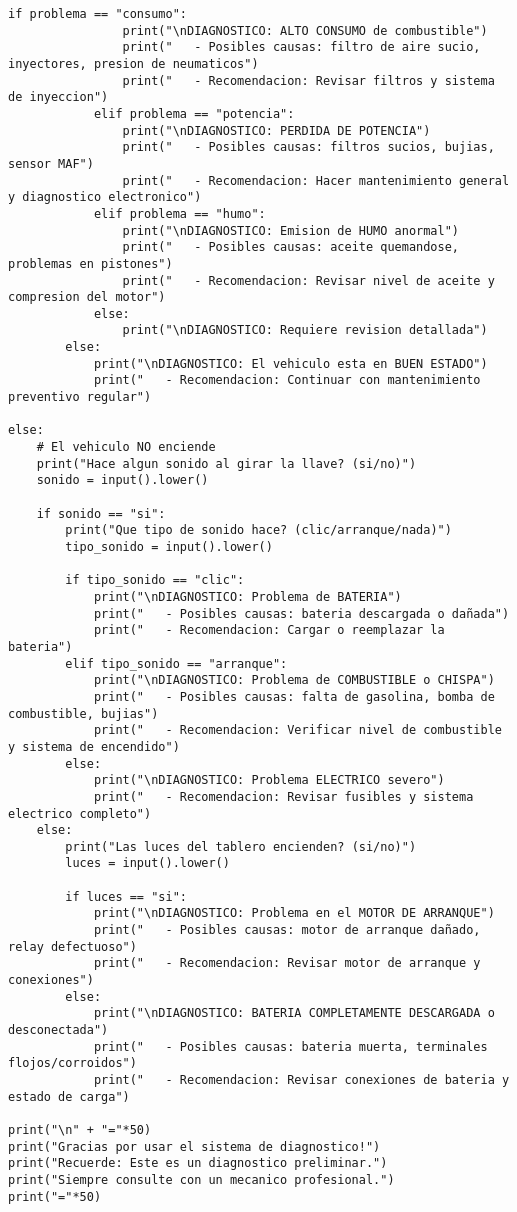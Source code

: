 \documentclass[12pt]{article}
\begin{document}
\begin{lstlisting}[caption={Sistema de Diagnóstico de Vehículos}]
            if problema == "consumo":
                print("\nDIAGNOSTICO: ALTO CONSUMO de combustible")
                print("   - Posibles causas: filtro de aire sucio, inyectores, presion de neumaticos")
                print("   - Recomendacion: Revisar filtros y sistema de inyeccion")
            elif problema == "potencia":
                print("\nDIAGNOSTICO: PERDIDA DE POTENCIA")
                print("   - Posibles causas: filtros sucios, bujias, sensor MAF")
                print("   - Recomendacion: Hacer mantenimiento general y diagnostico electronico")
            elif problema == "humo":
                print("\nDIAGNOSTICO: Emision de HUMO anormal")
                print("   - Posibles causas: aceite quemandose, problemas en pistones")
                print("   - Recomendacion: Revisar nivel de aceite y compresion del motor")
            else:
                print("\nDIAGNOSTICO: Requiere revision detallada")
        else:
            print("\nDIAGNOSTICO: El vehiculo esta en BUEN ESTADO")
            print("   - Recomendacion: Continuar con mantenimiento preventivo regular")

else:
    # El vehiculo NO enciende
    print("Hace algun sonido al girar la llave? (si/no)")
    sonido = input().lower()
    
    if sonido == "si":
        print("Que tipo de sonido hace? (clic/arranque/nada)")
        tipo_sonido = input().lower()
        
        if tipo_sonido == "clic":
            print("\nDIAGNOSTICO: Problema de BATERIA")
            print("   - Posibles causas: bateria descargada o dañada")
            print("   - Recomendacion: Cargar o reemplazar la bateria")
        elif tipo_sonido == "arranque":
            print("\nDIAGNOSTICO: Problema de COMBUSTIBLE o CHISPA")
            print("   - Posibles causas: falta de gasolina, bomba de combustible, bujias")
            print("   - Recomendacion: Verificar nivel de combustible y sistema de encendido")
        else:
            print("\nDIAGNOSTICO: Problema ELECTRICO severo")
            print("   - Recomendacion: Revisar fusibles y sistema electrico completo")
    else:
        print("Las luces del tablero encienden? (si/no)")
        luces = input().lower()
        
        if luces == "si":
            print("\nDIAGNOSTICO: Problema en el MOTOR DE ARRANQUE")
            print("   - Posibles causas: motor de arranque dañado, relay defectuoso")
            print("   - Recomendacion: Revisar motor de arranque y conexiones")
        else:
            print("\nDIAGNOSTICO: BATERIA COMPLETAMENTE DESCARGADA o desconectada")
            print("   - Posibles causas: bateria muerta, terminales flojos/corroidos")
            print("   - Recomendacion: Revisar conexiones de bateria y estado de carga")

print("\n" + "="*50)
print("Gracias por usar el sistema de diagnostico!")
print("Recuerde: Este es un diagnostico preliminar.")
print("Siempre consulte con un mecanico profesional.")
print("="*50)
\end{lstlisting}
\end{document}
